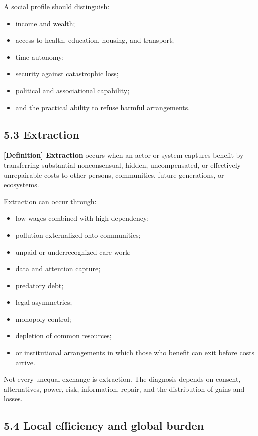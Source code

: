 \documentclass[
  11pt,
]{article}
\providecommand{\tightlist}{%
  \setlength{\itemsep}{0pt}\setlength{\parskip}{0pt}}
\begin{document}
A social profile should distinguish:

\begin{itemize}
\tightlist
\item
  income and wealth;
\item
  access to health, education, housing, and transport;
\item
  time autonomy;
\item
  security against catastrophic loss;
\item
  political and associational capability;
\item
  and the practical ability to refuse harmful arrangements.
\end{itemize}

\subsection{5.3 Extraction}\label{extraction}

\textbf{{[}Definition{]} Extraction} occurs when an actor or system
captures benefit by transferring substantial nonconsensual, hidden,
uncompensated, or effectively unrepairable costs to other persons,
communities, future generations, or ecosystems.

Extraction can occur through:

\begin{itemize}
\tightlist
\item
  low wages combined with high dependency;
\item
  pollution externalized onto communities;
\item
  unpaid or underrecognized care work;
\item
  data and attention capture;
\item
  predatory debt;
\item
  legal asymmetries;
\item
  monopoly control;
\item
  depletion of common resources;
\item
  or institutional arrangements in which those who benefit can exit
  before costs arrive.
\end{itemize}

Not every unequal exchange is extraction. The diagnosis depends on
consent, alternatives, power, risk, information, repair, and the
distribution of gains and losses.

\subsection{5.4 Local efficiency and global
burden}\label{local-efficiency-and-global-burden}
\end{document}
